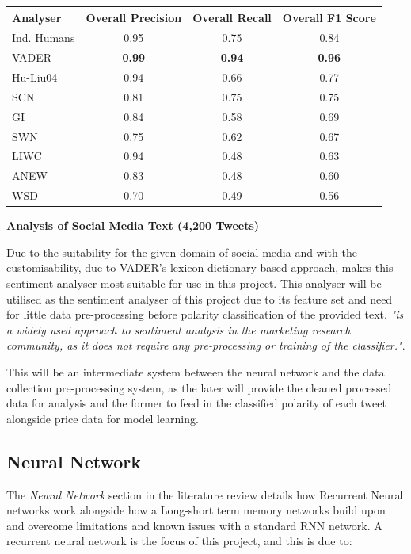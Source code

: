 \documentclass[oneside, 12pt]{article}
\begin{document}
		\begin{center}
			\begin{tabular}{l|c|c|c}
				\textbf{Analyser} & \textbf{Overall Precision} & \textbf{Overall Recall} & \textbf{Overall F1 Score}\\
				\hline
				\multirow{1}{*}{Ind. Humans} & 0.95 & 0.75 & 0.84 \\
				\multirow{1}{*}{VADER} & \textbf{0.99} & \textbf{0.94} & \textbf{0.96} \\
				\multirow{1}{*}{Hu-Liu04} & 0.94 & 0.66 & 0.77 \\
				\multirow{1}{*}{SCN} & 0.81 & 0.75 & 0.75 \\
				\multirow{1}{*}{GI} & 0.84 & 0.58 & 0.69 \\
				\multirow{1}{*}{SWN} & 0.75 & 0.62 & 0.67 \\
				\multirow{1}{*}{LIWC} & 0.94 & 0.48 & 0.63 \\
				\multirow{1}{*}{ANEW} & 0.83 & 0.48 & 0.60 \\
				\multirow{1}{*}{WSD} & 0.70 & 0.49 & 0.56 \\
			\end{tabular}
		
				\textbf{Analysis of Social Media Text (4,200 Tweets)}\cite{VADERPaper}
		\end{center}
		
		Due to the suitability for the given domain of social media and with the customisability, due to VADER's lexicon-dictionary based approach, makes this sentiment analyser most suitable for use in this project. This analyser will be utilised as the sentiment analyser of this project due to its feature set and need for little data pre-processing before polarity classification of the provided text. \cite{LexiconSocSent} \textit{"is a widely used approach to sentiment analysis in the marketing research community, as it does not require any pre-processing or training of the classifier."}.
		
		This will be an intermediate system between the neural network and the data collection pre-processing system, as the later will provide the cleaned processed data for analysis and the former to feed in the classified polarity of each tweet alongside price data for model learning.
		
		\subsection{Neural Network}
		The \textit{Neural Network} section in the literature review details how Recurrent Neural networks work alongside how a Long-short term memory networks build upon and overcome limitations and known issues with a standard RNN network. A recurrent neural network is the focus of this project, and this is due to:
		
\end{document}

